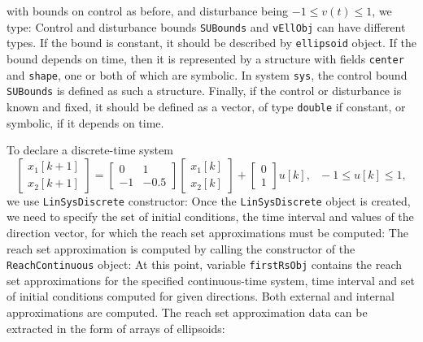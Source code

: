 with bounds on control as before, and disturbance being $-1\leq v(t)\leq1$,
we type:
Control and disturbance bounds {\tt SUBounds} and {\tt vEllObj} can have different types.
If the bound is constant, it should be described by {\tt ellipsoid} object.
If the bound depends on time, then it is represented by a structure with
fields {\tt center} and {\tt shape}, one or both of which are symbolic.
In system {\tt sys}, the control bound {\tt SUBounds} is defined as such a structure.
Finally, if the control or disturbance is known and fixed, it should be
defined as a vector, of type {\tt double} if constant, or symbolic, if
it depends on time.

To declare a discrete-time system
\[ \left[\begin{array}{c}
x_1[k+1]\\
x_2[k+1]\end{array}\right] = \left[\begin{array}{cc}
0 & 1\\
-1 & -0.5\end{array}\right]\left[\begin{array}{c}
x_1[k]\\
x_2[k]\end{array}\right] + \left[\begin{array}{c}
0\\
1\end{array}\right]u[k], ~~~ -1\leq u[k]\leq 1,\]
we use {\tt LinSysDiscrete} constructor:
Once the {\tt LinSysDiscrete} object is created, we need to specify the set
of initial conditions, the time interval and values of the direction vector,
for which the reach set approximations must be computed:
The reach set approximation is computed by calling the constructor
of the {\tt ReachContinuous} object:
At this point, variable {\tt firstRsObj} contains the reach set approximations for the
specified continuous-time system, time interval and set of initial conditions
computed for given directions. Both external and internal
approximations are computed.
The reach set approximation data can be
extracted in the form of arrays of ellipsoids:

